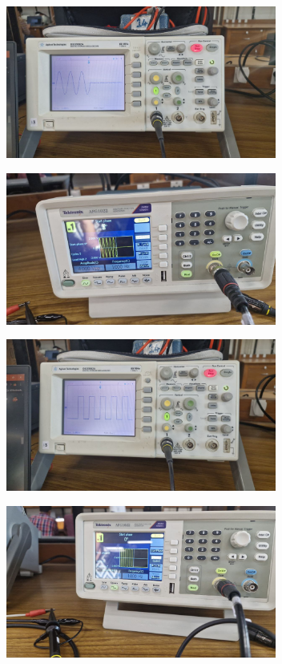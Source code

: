 \documentclass[a4paper,12pt]{article}
\begin{document}
\begin{figure}[H]
    \centering
    \begin{subfigure}{\textwidth}
        \centering
        \includegraphics[height=5cm]{figures/Capture_the_event/2/plot.jpg}
    \end{subfigure}%
    \begin{subfigure}{\textwidth}
        \centering
        \includegraphics[height=5cm]{figures/Capture_the_event/2/para.jpg}
    \end{subfigure}
\end{figure}
\begin{figure}[H]
    \centering
    \begin{subfigure}{\textwidth}
        \centering
        \includegraphics[height=5cm]{figures/Capture_the_event/3/plot.jpg}
    \end{subfigure}%
    \begin{subfigure}{\textwidth}
        \centering
        \includegraphics[height=5cm]{figures/Capture_the_event/3/para.jpg}
    \end{subfigure}
\end{figure}
\end{document}
